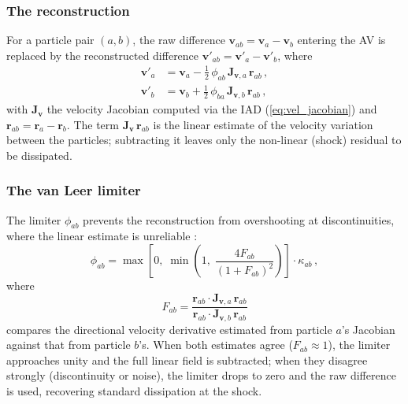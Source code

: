 \subsubsection*{The reconstruction}

For a particle pair $(a, b)$, the raw difference $\mathbf{v}_{ab} = \mathbf{v}_a - \mathbf{v}_b$ entering the AV is replaced by the reconstructed difference $\mathbf{v}'_{ab} = \mathbf{v}'_a - \mathbf{v}'_b$, where \cite{Cabezon2026}
\begin{align}
    \mathbf{v}'_a &= \mathbf{v}_a - \tfrac{1}{2}\,\phi_{ab}\, \mathbf{J}_{\mathbf{v},a}\, \mathbf{r}_{ab}\,, \label{eq:slr_va} \\
    \mathbf{v}'_b &= \mathbf{v}_b + \tfrac{1}{2}\,\phi_{ba}\, \mathbf{J}_{\mathbf{v},b}\, \mathbf{r}_{ab}\,, \label{eq:slr_vb}
\end{align}
with $\mathbf{J}_\mathbf{v}$ the velocity Jacobian computed via the IAD (\eqref{eq:vel_jacobian}) and $\mathbf{r}_{ab} = \mathbf{r}_a - \mathbf{r}_b$. The term $\mathbf{J}_\mathbf{v}\,\mathbf{r}_{ab}$ is the linear estimate of the velocity variation between the particles; subtracting it leaves only the non-linear (shock) residual to be dissipated.


\subsubsection*{The van Leer limiter}

The limiter $\phi_{ab}$ prevents the reconstruction from overshooting at discontinuities, where the linear estimate is unreliable \cite{Cabezon2026, Frontiere2017}:
\begin{equation}
    \phi_{ab} = \max\!\left[0,\; \min\!\left(1,\; \frac{4 F_{ab}}{(1 + F_{ab})^2}\right)\right] \cdot \kappa_{ab}\,,
    \label{eq:vanleer}
\end{equation}
where
\begin{equation}
    F_{ab} = \frac{\mathbf{r}_{ab} \cdot \mathbf{J}_{\mathbf{v},a}\, \mathbf{r}_{ab}}{\mathbf{r}_{ab} \cdot \mathbf{J}_{\mathbf{v},b}\, \mathbf{r}_{ab}}
    \label{eq:Fab}
\end{equation}
compares the directional velocity derivative estimated from particle $a$'s Jacobian against that from particle $b$'s. When both estimates agree ($F_{ab} \approx 1$), the limiter approaches unity and the full linear field is subtracted; when they disagree strongly (discontinuity or noise), the limiter drops to zero and the raw difference is used, recovering standard dissipation at the shock.

